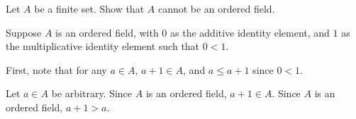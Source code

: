 \begin{problem}
  Let $A$ be a finite set.
  Show that $A$ cannot be an ordered field.
\end{problem}
\begin{answer}
  Suppose $A$ is an ordered field,
  with $0$ as the additive identity element, and $1$ as the multiplicative identity element
  such that $0 < 1$.

  \step
  First, note that for any $a \in A$, $a + 1 \in A$,
  and $a \le a + 1$ since $0 < 1$.
  
  Let $a \in A$ be arbitrary.
  Since $A$ is an ordered field, $a + 1 \in A$.
  Since $A$ is an ordered field, $a + 1 > a$.
  
\end{answer}
